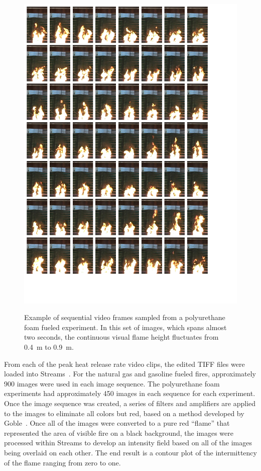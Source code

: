 \documentclass[twoside]{uocthesis}
\begin{document}
{\begin{figure}
	\centering
	\includegraphics[width=\textwidth]{../Figures/flame_height_comp_FHPUF}\\
	\caption[Example of sequential video frames sampled from a polyurethane foam fueled experiment]{Example of sequential video frames sampled from a polyurethane foam fueled experiment.  In this set of images, which spans almost two seconds, the continuous visual flame height fluctuates from 0.4~m to 0.9~m.}
	\label{flame_height_comp_FHPUF_1}
\end{figure}


From each of the peak heat release rate video clips, the edited TIFF files were loaded into Streams~\cite{Nokes:2011}.  For the natural gas and gasoline fueled fires, approximately 900 images were used in each image sequence.  The polyurethane foam experiments had approximately 450 images in each sequence for each experiment.  Once the image sequence was created, a series of filters and amplifiers are applied to the images to eliminate all colors but red, based on a method developed by Goble~\cite{Goble:2007}.  Once all of the images were converted to a pure red ``flame'' that represented the area of visible fire on a black background, the images were processed within Streams to develop an intensity field based on all of the images being overlaid on each other.  The end result is a contour plot of the intermittency of the flame ranging from zero to one.

}
\end{document}
